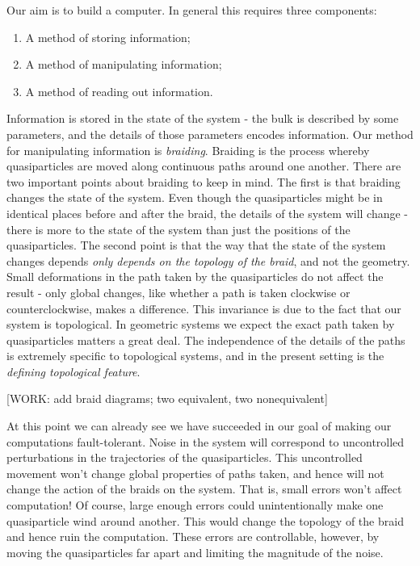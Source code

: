\documentclass{article}
\theoremstyle{definition}
\newcommand{\0}{\left|0\right>}
\newcommand{\1}{\left|1\right>}
\numberwithin{figure}{section}
\begin{document}
Our aim is to build a computer. In general this requires three components:

\begin{enumerate}
\item A method of storing information;
\item A method of manipulating information;
\item A method of reading out information.
\end{enumerate}

Information is stored in the state of the system - the bulk is described by some parameters, and the details of those parameters encodes information. Our method for manipulating information is \textit{braiding}. Braiding is the process whereby quasiparticles are moved along continuous paths around one another. There are two important points about braiding to keep in mind. The first is that braiding changes the state of the system. Even though the quasiparticles might be in identical places before and after the braid, the details of the system will change - there is more to the state of the system than just the positions of the quasiparticles. The second point is that the way that the state of the system changes depends \textit{only depends on the topology of the braid}, and not the geometry. Small deformations in the path taken by the quasiparticles do not affect the result - only global changes, like whether a path is taken clockwise or counterclockwise, makes a difference. This invariance is due to the fact that our system is topological. In geometric systems we expect the exact path taken by quasiparticles matters a great deal. The independence of the details of the paths is extremely specific to topological systems, and in the present setting is the \textit{defining topological feature}.

[WORK: add braid diagrams; two equivalent, two nonequivalent]

At this point we can already see we have succeeded in our goal of making our computations fault-tolerant. Noise in the system will correspond to uncontrolled perturbations in the trajectories of the quasiparticles. This uncontrolled movement won’t change global properties of paths taken, and hence will not change the action of the braids on the system. That is, small errors won't affect computation! Of course, large enough errors could unintentionally make one quasiparticle wind around another. This would change the topology of the braid and hence ruin the computation. These errors are controllable, however, by moving the quasiparticles far apart and limiting the magnitude of the noise.
\end{document}
